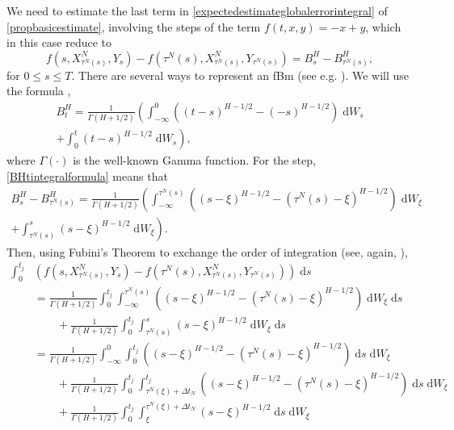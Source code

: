 \documentclass[reqno,12pt]{amsart}
\theoremstyle{plain} %
\theoremstyle{definition} %
\begin{document}
We need to estimate the last term in \eqref{expectedestimateglobalerrorintegral} of \cref{propbasicestimate}, involving the steps of the term $f(t, x, y) = -x + y$, which in this case reduce to
\begin{equation}
    \label{stepfBm}
    f(s, X_{\tau^N(s)}^N, Y_s) - f(\tau^N(s), X_{\tau^N(s)}^N, Y_{\tau^N(s)}) = B^H_s - B^H_{\tau^N(s)},
\end{equation}
for $0 \leq s \leq T$. There are several ways to represent an fBm (see e.g. \cite{BHOB2008, Mishura2008}). We will use the formula \cite[eq. (2.1)]{MandelbrotVanNess1968}, \cite[eq. (1.1)]{BHOB2008}
\begin{multline}
    \label{BHtintegralformula}
    B^H_t = \frac{1}{\Gamma(H + 1/2)}\left(\int_{-\infty}^0 \left( (t-s)^{H-1/2} - (-s)^{H-1/2}\right) \;\mathrm{d}W_s \right. \\
    \left. + \int_0^t (t - s)^{H-1/2} \;\mathrm{d}W_s\right),
\end{multline}
where $\Gamma(\cdot)$ is the well-known Gamma function. For the step, \eqref{BHtintegralformula} means that
\begin{multline}
    \label{BHtintegralformulastep}
    B^H_s - B^H_{\tau^N(s)} = \frac{1}{\Gamma(H + 1/2)}\left(\int_{-\infty}^{\tau^N(s)} \left( (s-\xi)^{H-1/2} - (\tau^N(s)-\xi)^{H-1/2}\right) \;\mathrm{d}W_\xi \right. \\
    \left. + \int_{\tau^N(s)}^s (s - \xi)^{H-1/2} \;\mathrm{d}W_\xi\right).
\end{multline}
Then, using Fubini's Theorem to exchange the order of integration (see, again, \cite[Section IV.6]{Protter2005}),
\begin{equation}
    \label{integralofstepfBm}
    \begin{aligned}
        \int_0^{t_j} & \left( f(s, X_{\tau^N(s)}^N, Y_s) - f(\tau^N(s), X_{\tau^N(s)}^N, Y_{\tau^N(s)}) \right)\;\mathrm{d}s \\
        & = \frac{1}{\Gamma(H + 1/2)}\int_0^{t_j} \int_{-\infty}^{\tau^N(s)} \left( (s-\xi)^{H-1/2} - (\tau^N(s)-\xi)^{H-1/2}\right) \;\mathrm{d}W_\xi \;\mathrm{d}s \\
        & \qquad + \frac{1}{\Gamma(H + 1/2)}\int_0^{t_j} \int_{\tau^N(s)}^s (s - \xi)^{H-1/2} \;\mathrm{d}W_\xi \;\mathrm{d}s \\
        & = \frac{1}{\Gamma(H + 1/2)}\int_{-\infty}^{0} \int_{0}^{t_j} \left( (s-\xi)^{H-1/2} - (\tau^N(s)-\xi)^{H-1/2}\right) \;\mathrm{d}s \;\mathrm{d}W_\xi \\
        & \qquad + \frac{1}{\Gamma(H + 1/2)}\int_{0}^{t_j} \int_{\tau^N(\xi)+\Delta t_N}^{t_j} \left( (s-\xi)^{H-1/2} - (\tau^N(s)-\xi)^{H-1/2}\right)  \;\mathrm{d}s \;\mathrm{d}W_\xi\\
        & \qquad + \frac{1}{\Gamma(H + 1/2)}\int_0^{t_j} \int_\xi^{\tau^N(\xi) + \Delta t_N} (s - \xi)^{H-1/2} \;\mathrm{d}s \;\mathrm{d}W_\xi \\
    \end{aligned}
\end{equation}
\end{document}
